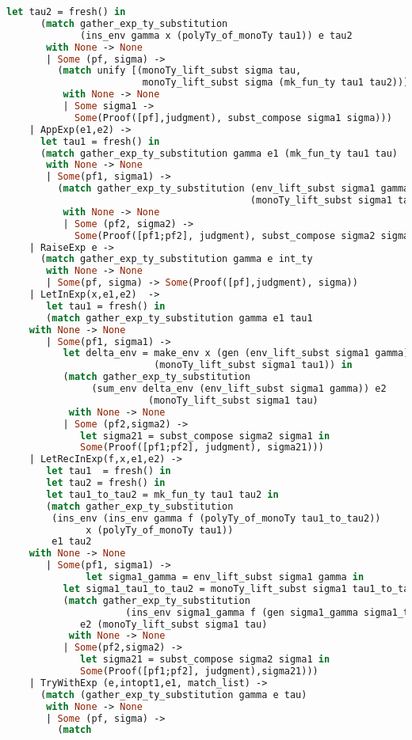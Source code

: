 \begin{lstlisting}[language=Caml, caption=definitions.ml]
      let tau2 = fresh() in
      (match gather_exp_ty_substitution
             (ins_env gamma x (polyTy_of_monoTy tau1)) e tau2
       with None -> None
       | Some (pf, sigma) ->
         (match unify [(monoTy_lift_subst sigma tau,
                        monoTy_lift_subst sigma (mk_fun_ty tau1 tau2))]
          with None -> None
          | Some sigma1 ->
            Some(Proof([pf],judgment), subst_compose sigma1 sigma)))
    | AppExp(e1,e2) ->
      let tau1 = fresh() in
      (match gather_exp_ty_substitution gamma e1 (mk_fun_ty tau1 tau)
       with None -> None
       | Some(pf1, sigma1) ->
         (match gather_exp_ty_substitution (env_lift_subst sigma1 gamma) e2
                                           (monoTy_lift_subst sigma1 tau1)
          with None -> None
          | Some (pf2, sigma2) ->
            Some(Proof([pf1;pf2], judgment), subst_compose sigma2 sigma1)))
    | RaiseExp e ->
      (match gather_exp_ty_substitution gamma e int_ty
       with None -> None
       | Some(pf, sigma) -> Some(Proof([pf],judgment), sigma))
    | LetInExp(x,e1,e2)  -> 
       let tau1 = fresh() in
       (match gather_exp_ty_substitution gamma e1 tau1
	with None -> None
	   | Some(pf1, sigma1) -> 
	      let delta_env = make_env x (gen (env_lift_subst sigma1 gamma) 
					      (monoTy_lift_subst sigma1 tau1)) in
	      (match gather_exp_ty_substitution 
		       (sum_env delta_env (env_lift_subst sigma1 gamma)) e2
                         (monoTy_lift_subst sigma1 tau)
	       with None -> None
		  | Some (pf2,sigma2) ->
		     let sigma21 = subst_compose sigma2 sigma1 in
		     Some(Proof([pf1;pf2], judgment), sigma21)))
    | LetRecInExp(f,x,e1,e2) ->
       let tau1  = fresh() in
       let tau2 = fresh() in
       let tau1_to_tau2 = mk_fun_ty tau1 tau2 in
       (match gather_exp_ty_substitution
		(ins_env (ins_env gamma f (polyTy_of_monoTy tau1_to_tau2))
			  x (polyTy_of_monoTy tau1))
		e1 tau2
	with None -> None
	   | Some(pf1, sigma1) -> 
              let sigma1_gamma = env_lift_subst sigma1 gamma in
	      let sigma1_tau1_to_tau2 = monoTy_lift_subst sigma1 tau1_to_tau2 in
	      (match gather_exp_ty_substitution
                     (ins_env sigma1_gamma f (gen sigma1_gamma sigma1_tau1_to_tau2))
		     e2 (monoTy_lift_subst sigma1 tau)
	       with None -> None
		  | Some(pf2,sigma2) ->
		     let sigma21 = subst_compose sigma2 sigma1 in
		     Some(Proof([pf1;pf2], judgment),sigma21)))
    | TryWithExp (e,intopt1,e1, match_list) ->
      (match (gather_exp_ty_substitution gamma e tau)
       with None -> None
       | Some (pf, sigma) ->
         (match

\end{lstlisting}
